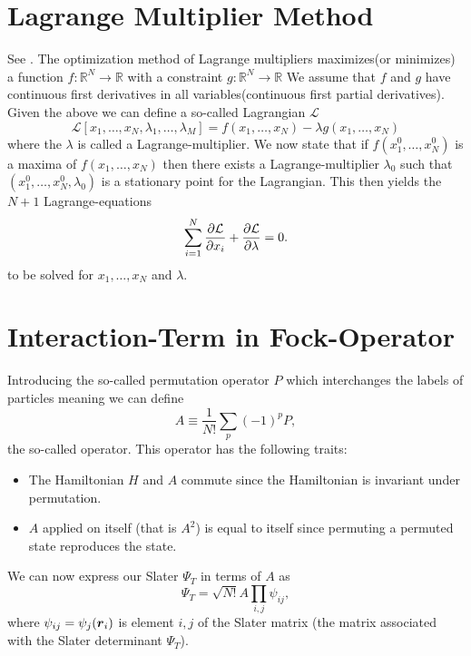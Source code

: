 \section{Lagrange Multiplier Method\label{sec:lagrange_multipliers}}
    See \cite{calcVar,calcVarSpring}. The optimization method of Lagrange
    multipliers maximizes(or minimizes) a function
    $f:\mathbb{R}^N\rightarrow\mathbb{R}$ with a constraint
    $g:\mathbb{R}^N\rightarrow\mathbb{R}$ We assume that $f$ and $g$ have
    continuous first derivatives in all variables(continuous first partial
    derivatives). \\
    Given the above we can define a so-called Lagrangian
    $\mathcal{L}$
        \begin{equation}
            \mathcal{L}[x_1,\dots,x_N,\lambda_1,\dots,\lambda_M] =
            f(x_1,\dots,x_N) - \lambda g(x_1,\dots,x_N)
            \label{eq:lagrangian}
        \end{equation}
    where the $\lambda$ is called a Lagrange-multiplier. We now state that if
    $f(x^0_1,\dots,x^0_N)$ is a maxima of $f(x_1,\dots,x_N)$ then there exists
    a Lagrange-multiplier $\lambda_0$ such that
    $(x^0_1,\dots,x^0_N,\lambda_0)$ is a stationary point
    for the Lagrangian. This then yields the $N+1$ Lagrange-equations
        \begin{align}
            \sum^N_{i=1} \frac{\mathrm{\partial}\mathcal{L}}{\mathrm{\partial} x_i} +
            \frac{\mathrm{\partial}\mathcal{L}}{\mathrm{\partial} \lambda} = 0.
            \label{eq:lagrangeEQ}
        \end{align}
    to be solved for $x_1,\dots,x_N$ and $\lambda$.

\section{Interaction-Term in Fock-Operator}
        Introducing the so-called permutation operator $P$ which interchanges
        the labels of particles meaning we can define
            \begin{equation}
                A \equiv \frac{1}{N!}\sum_p(-1)^pP,
            \end{equation}
        the so-called  operator. This operator has
        the following traits:
            \begin{itemize}
                \item The Hamiltonian $H$ and $A$ commute since the Hamiltonian
                    is invariant under permutation.
                \item $A$ applied on itself (that is $A^2$) is equal to itself
                    since permuting a permuted state reproduces the state.
            \end{itemize}
        We can now express our Slater $\Psi_T$ in terms of $A$ as
            \begin{equation}
                \Psi_T = \sqrt{N!}A\prod_{i,j}\psi_{ij},
            \end{equation}
        where $\psi_{ij}=\psi_j(\boldsymbol{{r}}_i)$ is element $i,j$ of the Slater
        matrix (the matrix associated with the Slater determinant $\Psi_T$).

